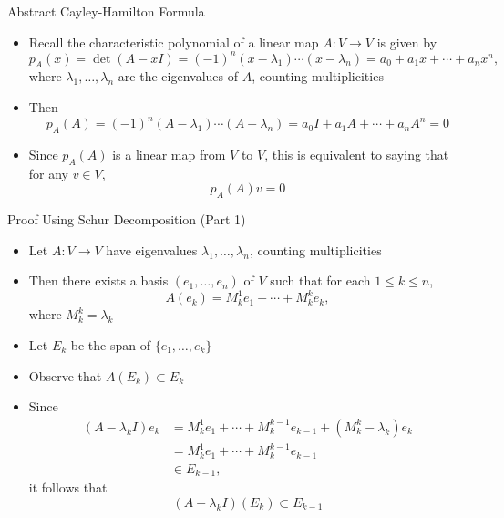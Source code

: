 \documentclass[usenames,dvipsnames,10pt]{beamer}
\begin{document}
\begin{frame}
  {Abstract Cayley-Hamilton Formula}

  \begin{itemize}
  \item Recall the characteristic polynomial of a linear map $A: V \rightarrow V$ is given by
    \[
      p_A(x) = \det (A-xI) = (-1)^n(x-\lambda_1)\cdots(x-\lambda_n) = a_0 + a_1x+\cdots+a_nx^n,
    \]
    where $\lambda_1, \dots, \lambda_n$ are the eigenvalues of $A$, counting multiplicities
  \item Then
    \[ p_A(A) = (-1)^n(A-\lambda_1)\cdots(A-\lambda_n) = a_0I + a_1A+\cdots+a_nA^n = 0 \]
  \item Since $p_A(A)$ is a linear map from $V$ to $V$, this is equivalent to saying that for any $v \in V$,
    \[ p_A(A)v = 0 \]
  \end{itemize}
\end{frame}

\begin{frame}
  {Proof Using Schur Decomposition (Part 1)}

  \begin{itemize}
  \item Let $A: V \rightarrow V$ have eigenvalues $\lambda_1, \dots, \lambda_n$, counting multiplicities
  \item Then there exists a basis $(e_1, \dots, e_n)$ of $V$ such that for each $1 \le k \le n$,
    \[
      A(e_k) = M_k^1e_1 + \cdots + M_k^ke_k,
    \]
    where $M^k_k = \lambda_k$
  \item Let $E_k$ be the span of $\{e_1, \dots, e_k\}$
  \item Observe that $A(E_k) \subset E_k$
  \item Since
    \begin{align*}
      (A-\lambda_kI)e_k &= M_k^1e_1 + \cdots + M_k^{k-1}e_{k-1} + (M_k^k-\lambda_k)e_k\\
                        &= M_k^1e_1 + \cdots + M_k^{k-1}e_{k-1}\\
                        &\in E_{k-1},
    \end{align*}
    it follows that
    \[
      (A-\lambda_kI)(E_k) \subset E_{k-1}
    \]
  \end{itemize}
\end{frame}
\end{document}
